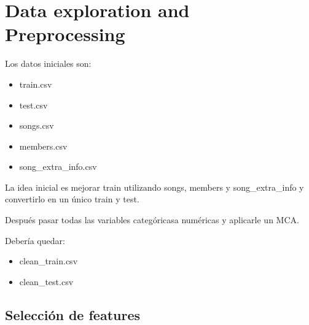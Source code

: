 \documentclass[a4paper]{article}
\begin{document}


\section{Data exploration and Preprocessing}

Los datos iniciales son: 
\begin{itemize}
\item train.csv
\item test.csv
\item songs.csv
\item members.csv
\item song\_extra\_info.csv
\end{itemize}

La idea inicial es mejorar train utilizando songs, members y song\_extra\_info y convertirlo en un único train y test. 

Después pasar todas las variables categóricasa numéricas y aplicarle un MCA.

Debería quedar: 
\begin{itemize}
\item clean\_train.csv
\item clean\_test.csv
\end{itemize}


\subsection{Selección de features}
\end{document}
